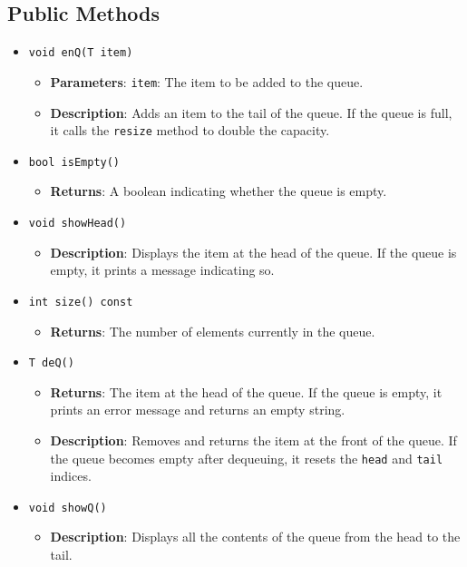 \documentclass{article}
\begin{document}
\subsection{Public Methods}
\begin{itemize}
    \item \texttt{void enQ(T item)}
    \begin{itemize}
        \item \textbf{Parameters}: \texttt{item}: The item to be added to the queue.
        \item \textbf{Description}: Adds an item to the tail of the queue. If the queue is full, it calls the \texttt{resize} method to double the capacity.
    \end{itemize}

    \item \texttt{bool isEmpty()}
    \begin{itemize}
        \item \textbf{Returns}: A boolean indicating whether the queue is empty.
    \end{itemize}

    \item \texttt{void showHead()}
    \begin{itemize}
        \item \textbf{Description}: Displays the item at the head of the queue. If the queue is empty, it prints a message indicating so.
    \end{itemize}

    \item \texttt{int size() const}
    \begin{itemize}
        \item \textbf{Returns}: The number of elements currently in the queue.
    \end{itemize}

    \item \texttt{T deQ()}
    \begin{itemize}
        \item \textbf{Returns}: The item at the head of the queue. If the queue is empty, it prints an error message and returns an empty string.
        \item \textbf{Description}: Removes and returns the item at the front of the queue. If the queue becomes empty after dequeuing, it resets the \texttt{head} and \texttt{tail} indices.
    \end{itemize}

    \item \texttt{void showQ()}
    \begin{itemize}
        \item \textbf{Description}: Displays all the contents of the queue from the head to the tail.
    \end{itemize}
\end{itemize}
\end{document}
